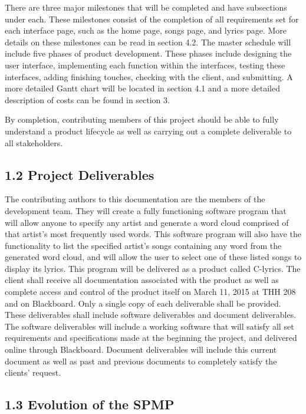 \documentclass[]{article}
\begin{document}
There are three major milestones that will be completed and have
subsections under each. These milestones consist of the completion of
all requirements set for each interface page, such as the home page,
songs page, and lyrics page. More details on these milestones can be
read in section 4.2. The master schedule will include five phases of
product development. These phases include designing the user interface,
implementing each function within the interfaces, testing these
interfaces, adding finishing touches, checking with the client, and
submitting. A more detailed Gantt chart will be located in section 4.1
and a more detailed description of costs can be found in section 3.

By completion, contributing members of this project should be able to
fully understand a product lifecycle as well as carrying out a complete
deliverable to all stakeholders.

\subsection{1.2 Project Deliverables}\label{project-deliverables}

The contributing authors to this documentation are the members of the
development team. They will create a fully functioning software program
that will allow anyone to specify any artist and generate a word cloud
comprised of that artist's most frequently used words. This software
program will also have the functionality to list the specified artist's
songs containing any word from the generated word cloud, and will allow
the user to select one of these listed songs to display its lyrics. This
program will be delivered as a product called C-lyrics. The client shall
receive all documentation associated with the product as well as
complete access and control of the product itself on March 11, 2015 at
THH 208 and on Blackboard. Only a single copy of each deliverable shall
be provided. These deliverables shall include software deliverables and
document deliverables. The software deliverables will include a working
software that will satisfy all set requirements and specifications made
at the beginning the project, and delivered online through Blackboard.
Document deliverables will include this current document as well as past
and previous documents to completely satisfy the clients' request.

\subsection{1.3 Evolution of the SPMP}\label{evolution-of-the-spmp}
\end{document}
